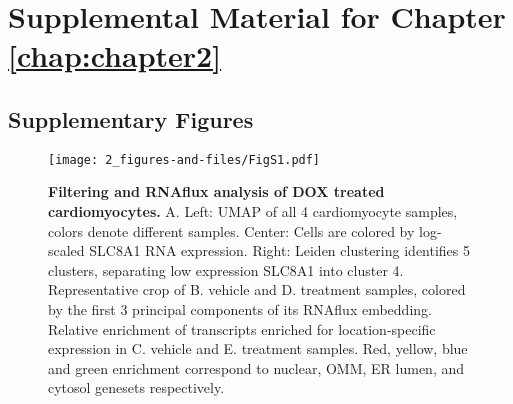 \chapter{Supplemental Material for Chapter \ref{chap:chapter2}}

\section{Supplementary Figures}

\begin{figure}[h]
    \centering
    \texttt{[image: 2\_figures-and-files/FigS1.pdf]}
    \caption[Filtering and RNAflux analysis of DOX treated cardiomyocytes.]{\textbf{Filtering and RNAflux analysis of DOX treated cardiomyocytes.} A. Left: UMAP of all 4 cardiomyocyte samples, colors denote different samples. Center: Cells are colored by log-scaled SLC8A1 RNA expression. Right: Leiden clustering identifies 5 clusters, separating low expression SLC8A1 into cluster 4. Representative crop of B. vehicle and D. treatment samples, colored by the first 3 principal components of its RNAflux embedding. Relative enrichment of transcripts enriched for location-specific expression in C. vehicle and E. treatment samples. Red, yellow, blue and green enrichment correspond to nuclear, OMM, ER lumen, and cytosol genesets respectively. }\label{fig:supplement cardio filtering and rnaflux}
\end{figure}
